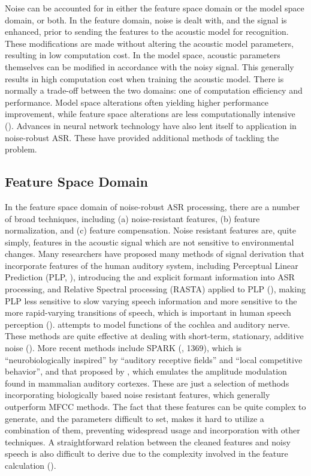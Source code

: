 Noise can be accounted for in either the feature space domain or the model space domain, or both.  In the feature domain, noise is dealt with, and the signal is enhanced, prior to sending the features to the acoustic model for recognition.  These modifications are made without altering the acoustic model parameters, resulting in low computation cost.  In the model space, acoustic parameters themselves can be modified in accordance with the noisy signal.  This generally results in high computation cost when training the acoustic model.  There is normally a trade-off between the two domains: one of computation efficiency and performance. Model space alterations often yielding higher performance improvement, while feature space alterations are less computationally intensive (\cite{li:14}).
Advances in neural network technology have also lent itself to application in noise-robust ASR.  These have provided additional methods of tackling the problem.

\subsection{Feature Space Domain}

In the feature space domain of noise-robust ASR processing, there are a number of broad techniques, including (a) noise-resistant features, (b) feature normalization, and  (c) feature compensation.  Noise resistant features are, quite simply, features in the acoustic signal which are not sensitive to environmental changes.  Many researchers have proposed many methods of signal derivation that incorporate features of the human auditory system, including Perceptual Linear Prediction (PLP, \cite{hermansky:85}), introducing the \DIFdelbegin {}\DIFdelend \DIFaddbegin {}\DIFaddend and explicit formant information into ASR processing, and Relative Spectral processing (RASTA) applied to PLP (\cite{hermansky:92}), making PLP less sensitive to slow varying speech information and more sensitive to the more rapid-varying transitions of speech, which is important in human speech perception (\cite{willi:17}).  \cite{kim:99} attempts to model functions of the cochlea and auditory nerve. These methods are quite effective at dealing with short-term, stationary, additive noise (\cite{zhang:17}).  More recent methods include SPARK (\cite{fazel:12}, 1369), which is ``neurobiologically inspired'' by ``auditory receptive fields'' and ``local competitive behavior'', and that proposed by \cite{moritz:15}, which emulates the amplitude modulation found in mammalian auditory cortexes.  These are just a selection of methods incorporating biologically based noise resistant features, which generally outperform \DIFdelbegin {}\DIFdelend \DIFaddbegin {}\DIFaddend MFCC methods. The fact that these features can be quite complex to generate, and the parameters difficult to set, makes it hard to utilize a combination of them, preventing widespread usage and incorporation with other techniques.  A straightforward relation between the cleaned features and noisy speech is also difficult to derive due to the complexity involved in the feature calculation (\cite{li:14}).

